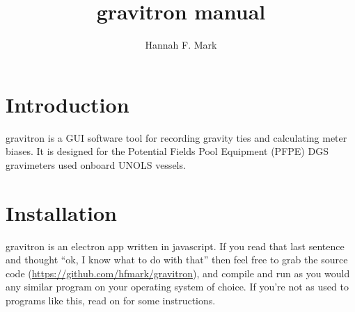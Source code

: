 \documentclass{pfpe-manual}
\title{gravitron manual}
\author{Hannah F. Mark}
\begin{document}
\maketitle

\tableofcontents
\newpage

\section{Introduction}

gravitron is a GUI software tool for recording gravity ties and calculating meter biases. It is designed for the Potential Fields Pool Equipment (PFPE) DGS gravimeters used onboard UNOLS vessels.

\section{Installation}
\label{install}
gravitron is an electron app written in javascript. If you read that last sentence and thought ``ok, I know what to do with that'' then feel free to grab the source code (\url{https://github.com/hfmark/gravitron}), and compile and run as you would any similar program on your operating system of choice. If you're not as used to programs like this, read on for some instructions.
\end{document}
